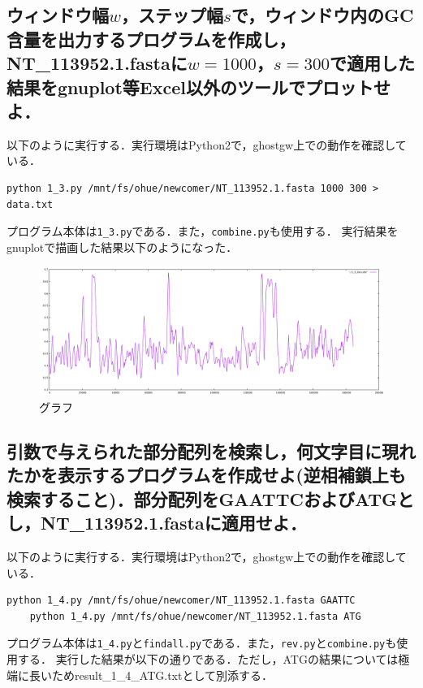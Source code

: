\documentclass[uplatex,a4j]{jsarticle}
\begin{document}
  \subsection{ウィンドウ幅$w$，ステップ幅$s$で，ウィンドウ内のGC含量を出力するプログラムを作成し，NT\_113952.1.fastaに$w=1000$，$s=300$で適用した結果をgnuplot等Excel以外のツールでプロットせよ．}
  以下のように実行する．実行環境はPython2で，ghostgw上での動作を確認している．
  \begin{lstlisting}[caption=実行方法, label=run3]
    python 1_3.py /mnt/fs/ohue/newcomer/NT_113952.1.fasta 1000 300 > data.txt
  \end{lstlisting}
  プログラム本体は{\tt 1\_3.py}である．また，{\tt combine.py}も使用する．
  実行結果をgnuplotで描画した結果以下のようになった．
  \begin{figure}[htbp]
    \begin{center}
      \includegraphics[width=15cm]{1_3_pdf.pdf}
      \caption{グラフ}
    \end{center}
  \end{figure}
  
  \subsection{引数で与えられた部分配列を検索し，何文字目に現れたかを表示するプログラムを作成せよ(逆相補鎖上も検索すること)．部分配列をGAATTCおよびATGとし，NT\_113952.1.fastaに適用せよ．}
  以下のように実行する．実行環境はPython2で，ghostgw上での動作を確認している．
  \begin{lstlisting}[caption=実行方法, label=run4]
    python 1_4.py /mnt/fs/ohue/newcomer/NT_113952.1.fasta GAATTC
    python 1_4.py /mnt/fs/ohue/newcomer/NT_113952.1.fasta ATG
  \end{lstlisting}
  プログラム本体は{\tt 1\_4.py}と{\tt findall.py}である．また，{\tt rev.py}と{\tt combine.py}も使用する．
  実行した結果が以下の通りである．ただし，ATGの結果については極端に長いためresult\_1\_4\_ATG.txtとして別添する．
  
  
\end{document}
